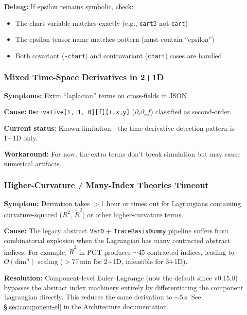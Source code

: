 \textbf{Debug:} If epsilon remains symbolic, check:

\begin{itemize}
  \item The chart variable matches exactly (e.g., \texttt{cart3} not \texttt{cart})
  \item The epsilon tensor name matches pattern (must contain ``epsilon'')
  \item Both covariant (\texttt{-chart}) and contravariant (\texttt{chart}) cases are handled
\end{itemize}

\subsubsection{Mixed Time-Space Derivatives in 2+1D}

\textbf{Symptoms:} Extra ``laplacian'' terms on cross-fields in JSON.

\textbf{Cause:} \texttt{Derivative[1, 1, 0][f][t,x,y]} ($\partial_t \partial_x f$) classified as second-order.

\textbf{Current status:} Known limitation---the time derivative detection pattern is 1+1D only.

\textbf{Workaround:} For now, the extra terms don't break simulation but may cause numerical artifacts.


\subsubsection{Higher-Curvature / Many-Index Theories Timeout}
\label{sec:higher-curvature-timeout}

\textbf{Symptom:} Derivation takes $>$1 hour or times out for Lagrangians containing curvature-squared ($R^2$, $\tilde{R}^2$) or other higher-curvature terms.

\textbf{Cause:} The legacy abstract \texttt{VarD} + \texttt{TraceBasisDummy} pipeline suffers from combinatorial explosion when the Lagrangian has many contracted abstract indices. For example, $\tilde{R}^2$ in PGT produces $\sim$45 contracted indices, leading to $O(\text{dim}^n)$ scaling ($>$77\,min for 2+1D, infeasible for 3+1D).

\textbf{Resolution:} Component-level Euler--Lagrange (now the default since v0.15.0) bypasses the abstract index machinery entirely by differentiating the component Lagrangian directly. This reduces the same derivation to $\sim$5\,s. See \S\ref{sec:component-el} in the Architecture documentation.

